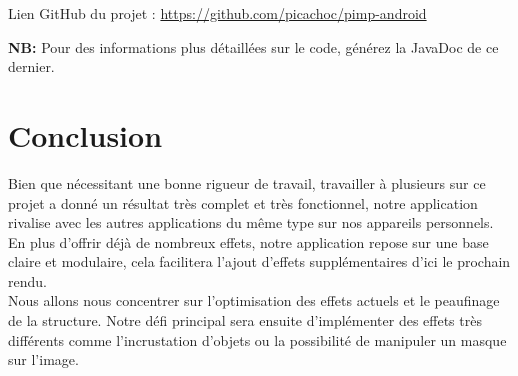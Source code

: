 \documentclass[12pt, a4paper]{article}
\begin{document}
\vspace{1cm}
\faArrowRight Lien GitHub du projet :
\href{https://github.com/picachoc/pimp-android}{https://github.com/picachoc/pimp-android}
\vspace{0.5cm}

\textbf{NB: } Pour des informations plus détaillées sur le code, générez la JavaDoc de ce dernier.

\clearpage


\clearpage


\clearpage


\clearpage


\clearpage


\clearpage


\clearpage 

\section{Conclusion}
Bien que nécessitant une bonne rigueur de travail, travailler à plusieurs sur ce projet a donné un résultat très complet et très fonctionnel, notre application rivalise avec les autres applications du même type sur nos appareils personnels.
\\
En plus d'offrir déjà de nombreux effets, notre application repose sur une base claire et modulaire, cela facilitera l'ajout d'effets supplémentaires d'ici le prochain rendu. 
\\
Nous allons nous concentrer sur l'optimisation des effets actuels et le peaufinage de la structure. Notre défi principal sera ensuite d'implémenter des effets très différents comme l'incrustation d'objets ou la possibilité de manipuler un masque sur l'image.
\end{document}

